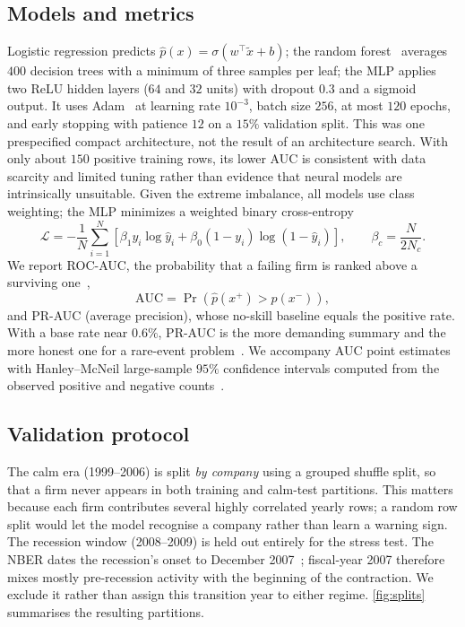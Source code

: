 \documentclass[manuscript,nonacm]{acmart}
\begin{document}
\subsection{Models and metrics}
Logistic regression predicts $\hat{p}(x)=\sigma(w^{\!\top}\tilde{x}+b)$; the random
forest~\cite{breiman2001} averages $400$ decision trees with a minimum of three samples
per leaf; the MLP applies two ReLU hidden layers ($64$ and $32$ units) with dropout
$0.3$ and a sigmoid output. It uses Adam~\cite{kingma2015adam} at learning rate
$10^{-3}$, batch size $256$, at most $120$ epochs, and early stopping with patience $12$
on a $15\%$ validation split. This was one prespecified compact architecture, not the
result of an architecture search. With only about $150$ positive training rows, its
lower AUC is consistent with data scarcity and limited tuning rather than evidence that
neural models are intrinsically unsuitable.
Given the extreme imbalance, all models use class weighting; the MLP minimizes a
weighted binary cross-entropy
\begin{equation}
\mathcal{L}=-\frac{1}{N}\sum_{i=1}^{N}
  \left[\beta_1 y_i\log\hat{y}_i+\beta_0(1-y_i)\log(1-\hat{y}_i)\right],
\qquad \beta_c=\frac{N}{2N_c}.
\label{eq:loss}
\end{equation}
We report ROC-AUC, the probability that a failing firm is ranked above a surviving
one~\cite{fawcett2006},
\begin{equation}
\mathrm{AUC}=\Pr\!\left(\hat{p}(x^{+})>\hat{p}(x^{-})\right),
\label{eq:auc}
\end{equation}
and PR-AUC (average precision), whose no-skill baseline equals the positive rate. With a
base rate near $0.6\%$, PR-AUC is the more demanding summary and the more honest one for
a rare-event problem~\cite{davis2006,saito2015}. We accompany AUC point estimates with
Hanley--McNeil large-sample $95\%$ confidence intervals computed from the observed
positive and negative counts~\cite{hanley1982}.

\subsection{Validation protocol}
The calm era (1999--2006) is split \emph{by company} using a grouped shuffle split, so
that a firm never appears in both training and calm-test partitions. This matters
because each firm contributes several highly correlated yearly rows; a random row split
would let the model recognise a company rather than learn a warning sign. The recession
window (2008--2009) is held out entirely for the stress test. The NBER dates the
recession's onset to December 2007~\cite{nber2010}; fiscal-year 2007 therefore mixes
mostly pre-recession activity with the beginning of the contraction. We exclude it
rather than assign this transition year to either regime. \cref{fig:splits} summarises
the resulting partitions.
\end{document}
